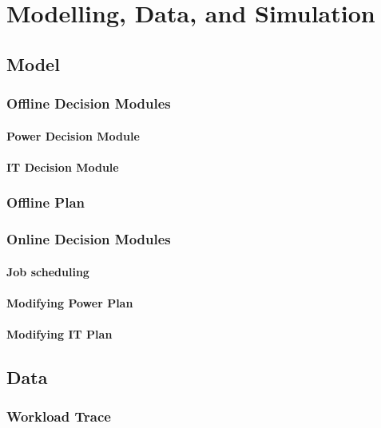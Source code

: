 \chapter{Modelling, Data, and Simulation}

\section{Model}

\subsection{Offline Decision Modules}

\subsubsection{Power Decision Module}

\subsubsection{IT Decision Module}

\subsection{Offline Plan}

\subsection{Online Decision Modules}

\subsubsection{Job scheduling}

\subsubsection{Modifying Power Plan}

\subsubsection{Modifying IT Plan}

\section{Data}

\subsection{Workload Trace}

